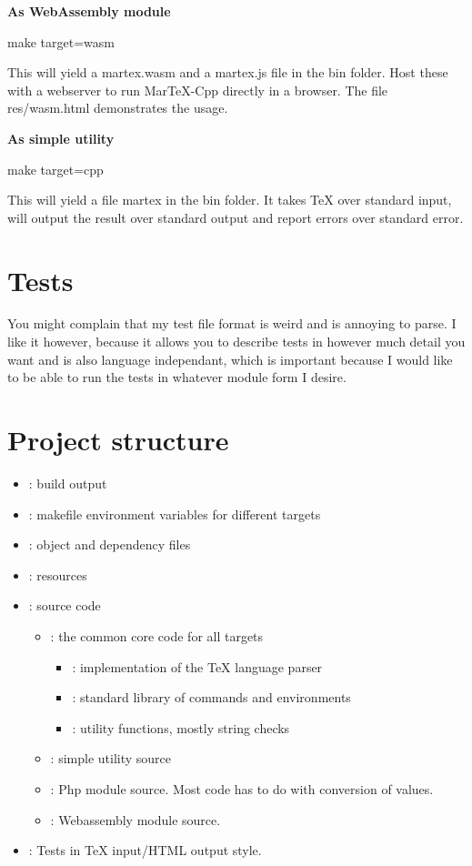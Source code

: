 \begin{page}
\textbf{As \textbf{WebAssembly} module}
\begin{code}
make target=wasm
\end{code}
This will yield a martex.wasm and a martex.js file in the bin folder. Host these with a webserver to run MarTeX-Cpp directly in a browser. The file res/wasm.html demonstrates the usage.

\textbf{As simple utility}
\begin{code}
make target=cpp
\end{code}
This will yield a file martex in the bin folder. It takes TeX over standard input, will output the result over standard output and report errors over standard error.

\section{Tests}

You might complain that my test file format is weird and is annoying to parse. I like it however, because it allows you to describe tests in however much detail you want and is also language independant, which is important because I would like to be able to run the tests in whatever module form I desire. 

\section{Project structure}

\begin{itemize}
\item {}: build output
\item {}: makefile environment variables for different targets
\item {}: object and dependency files
\item {}: resources
\item {}: source code
\begin{itemize}
  \item {}: the common core code for all targets
  \begin{itemize}
    \item {}: implementation of the TeX language parser
    \item {}: standard library of commands and environments
    \item {}: utility functions, mostly string checks
  \end{itemize}
  \item {}: simple utility source
  \item {}: Php module source. Most code has to do with conversion of values.
  \item {}: Webassembly module source.
\end{itemize}
\item {}: Tests in TeX input/HTML output style.
\end{itemize}


\end{page}
